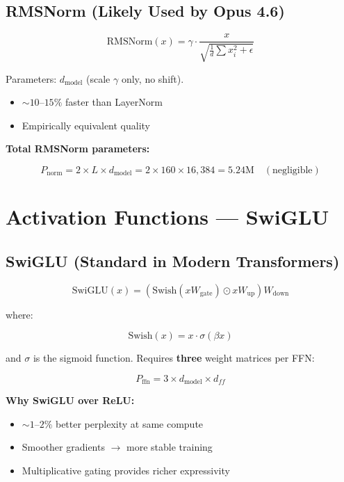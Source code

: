 \documentclass[11pt,a4paper]{article}
\begin{document}
\subsection{RMSNorm (Likely Used by Opus 4.6)}

$$\text{RMSNorm}(x) = \gamma \cdot \frac{x}{\sqrt{\frac{1}{d}\sum x_i^2 + \epsilon}}$$

Parameters: $d_{\text{model}}$ (scale $\gamma$ only, no shift).

\begin{itemize}
  \item $\sim 10\text{--}15\%$ faster than LayerNorm
  \item Empirically equivalent quality
\end{itemize}

\textbf{Total RMSNorm parameters:}

$$P_{\text{norm}} = 2 \times L \times d_{\text{model}} = 2 \times 160 \times 16{,}384 = 5.24\text{M} \quad (\text{negligible})$$

\section{Activation Functions --- SwiGLU}

\subsection{SwiGLU (Standard in Modern Transformers)}

$$\text{SwiGLU}(x) = \left(\text{Swish}(xW_{\text{gate}}) \odot xW_{\text{up}}\right) W_{\text{down}}$$

where:

$$\text{Swish}(x) = x \cdot \sigma(\beta x)$$

and $\sigma$ is the sigmoid function. Requires \textbf{three} weight matrices per FFN:

$$P_{\text{ffn}} = 3 \times d_{\text{model}} \times d_{ff}$$

\textbf{Why SwiGLU over ReLU:}
\begin{itemize}
  \item $\sim 1\text{--}2\%$ better perplexity at same compute
  \item Smoother gradients $\to$ more stable training
  \item Multiplicative gating provides richer expressivity
\end{itemize}
\end{document}
